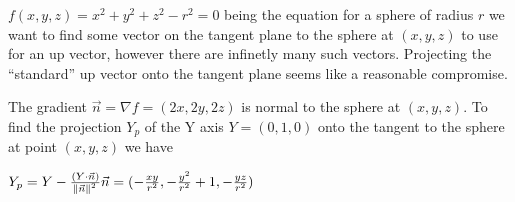 \documentclass[fleqn]{article}
\newcommand{\vv}[1] {\vec{#1}}
\begin{document}
$f(x,y,z) = x^2 + y^2 + z^2 -r^2 = 0$ being the equation for a sphere of radius $r$ we
want to find some vector on the tangent plane to the sphere at $(x, y, z)$ to use
for an up vector, however there are infinetly many such vectors.
Projecting the ``standard'' up vector onto the tangent plane seems like a reasonable
compromise.

The gradient $\vv{n} = \nabla{f} = (2x, 2y, 2z)$ is normal to the sphere at
$(x, y, z)$. To find the projection $Y_p$ of the Y axis $Y = (0,1,0)$ onto the tangent to the
sphere at point $(x, y, z)$ we have

$Y_p = Y - \frac{(Y \cdot \vv{n})}{\norm{\vv{n}}^2}\vv{n} =
(-\frac{xy}{r^2}, -\frac{y^2}{r^2} + 1, -\frac{yz}{r^2})$
\end{document}
